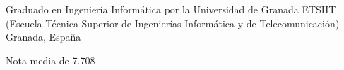 

\begin{cventries}

  \cventry
    {Graduado en Ingeniería Informática por la Universidad de Granada} %
    {ETSIIT (Escuela Técnica Superior de Ingenierías Informática y de Telecomunicación)} %
    {Granada, España} %
    {} %
    {
      \begin{cvitems} %
        \item {Nota media de 7.708}
      \end{cvitems}
    }

\end{cventries}
